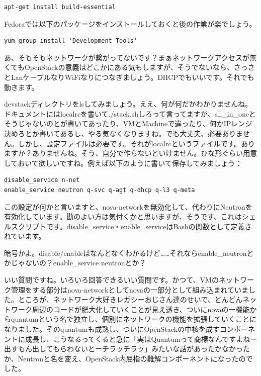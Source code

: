 \documentclass[8pt,b5paper,tombo,openany]{jsbook}
\begin{document}
\begin{lstlisting}
apt-get install build-essential
\end{lstlisting}

Fedoraでは以下のパッケージをインストールしておくと後の作業が楽でしょう。

\begin{lstlisting}
yum group install 'Development Tools'
\end{lstlisting}

あ、そもそもネットワークが繋がってないです？まぁネットワークアクセスが無くてもOpenStackの意義はどこかにある気もしますが、そうでないなら、さっさとLanケーブルなりWiFiなりにつなぎましょう。DHCPでもいいです。それでも動きます。

devstackディレクトリをlsしてみましょう。ええ、何が何だかわかりませんね。ドキュメントにはlocalrcを書いて./stack.shしろって言ってますが、all\_in\_oneとそうじゃないのとが書いてあったり、VMとMachineで違ったり、何かIPレンジ決めろとか書いてあるし、やる気なくなりますね。でも大丈夫、必要ありません。しかし、設定ファイルは必要です。それがlocalrcというファイルです。ありますか？ありませんね。そう、自分で作らないといけません。ひな形ぐらい用意しておいて欲しいですね。例えば以下のように書いて保存してみましょう：

\begin{lstlisting}
disable_service n-net
enable_service neutron q-svc q-agt q-dhcp q-l3 q-meta
\end{lstlisting}

この設定が何かと言いますと、nova-networkを無効化して、代わりにNeutronを有効化しています。勘のよい方は気付くかと思いますが、そうです、これはシェルスクリプトです。disable\_service・enable\_serviceはBashの関数として定義されています。

暗号かよ。disable/enableはなんとなくわかるけど……それならenable\_neutronとかじゃないの？enable\_service neutronとか？

いい質問ですね。いろいろ回答できるいい質問です。かつて、VMのネットワーク管理をする部分はnova-networkとしてnovaの一部分として組み込まれていました。ところが、ネットワーク大好きレガシーおじさん達のせいで、どんどんネットワーク周辺のコードが肥大化していくことが見え透き、ついにnovaの一機能からquantumという名で独立し、個別にネットワークの機能を拡張していくことになりました。そのquantumも成熟し、ついにOpenStackの中核を成すコンポーネントに成長し、こうなるってくると急に「実はQuantumって商標なんですよねー出すもん出してもらわないとーチラッチラッ」みたいな話があったかなかったか、Neutronと名を変え、OpenStack内屈指の難解コンポーネントになったのでした。
\end{document}
